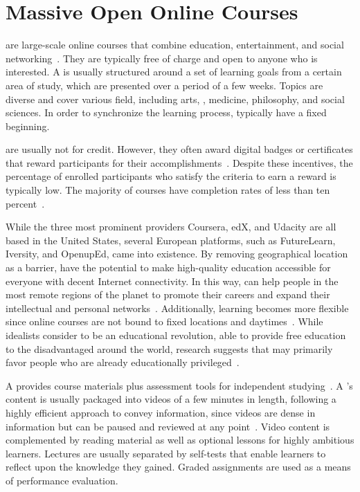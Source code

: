 \section{Massive Open Online Courses}\label{section:moocs}

\moocs are large-scale online courses that combine education, entertainment, and social networking~\cite{pappano2012year}. They are typically free of charge and open to anyone who is interested. A \mooc is usually structured around a set of learning goals from a certain area of study, which are presented over a period of a few weeks. Topics are diverse and cover various field, including arts, \cs, medicine, philosophy, and social sciences. In order to synchronize the learning process, \moocs typically have a fixed beginning.

\moocs are usually not for credit. However, they often award digital badges or certificates that reward participants for their accomplishments~\cite{chauhan2014massive}. Despite these incentives, the percentage of enrolled \mooc participants who satisfy the criteria to earn a reward is typically low. The majority of courses have completion rates of less than ten percent~\cite{jordan2014initial}.

While the three most prominent \mooc providers Coursera, edX, and Udacity are all based in the United States, several European platforms, such as FutureLearn, Iversity, and OpenupEd, came into existence. By removing geographical location as a barrier, \moocs have the potential to make high-quality education accessible for everyone with decent Internet connectivity. In this way, \moocs can help people in the most remote regions of the planet to promote their careers and expand their intellectual and personal networks~\cite{pappano2012year}. Additionally, learning becomes more flexible since online courses are not bound to fixed locations and daytimes~\cite{neuhaus2014platform}. While idealists consider \moocs to be an educational revolution, able to provide free education to the disadvantaged around the world, research suggests that \moocs may primarily favor people who are already educationally privileged~\cite{jordan2014initial}.

A \mooc provides course materials plus assessment tools for independent studying~\cite{european2014support}. A \mooc's content is usually packaged into videos of a few minutes in length, following a highly efficient approach to convey information, since videos are dense in information but can be paused and reviewed at any point~\cite{fox2014software}. Video content is complemented by reading material as well as optional lessons for highly ambitious learners. Lectures are usually separated by self-tests that enable learners to reflect upon the knowledge they gained. Graded assignments are used as a means of performance evaluation.

